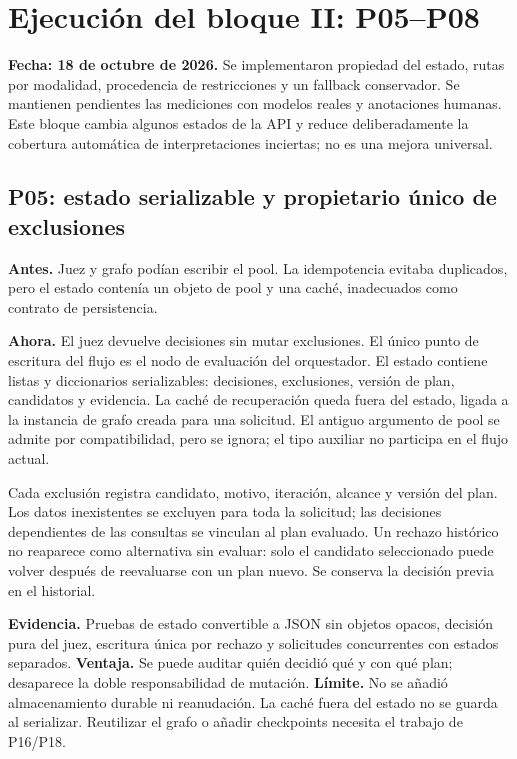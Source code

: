 \section{Ejecución del bloque II: P05--P08}
\label{sec:bloque2}
\textbf{Fecha: 18 de octubre de 2026.} Se implementaron propiedad del estado,
rutas por modalidad, procedencia de restricciones y un fallback conservador.
Se mantienen pendientes las mediciones con modelos reales y anotaciones humanas.
Este bloque cambia algunos estados de la API y reduce deliberadamente la
cobertura automática de interpretaciones inciertas; no es una mejora universal.

\subsection{P05: estado serializable y propietario único de exclusiones}
\textbf{Antes.} Juez y grafo podían escribir el pool. La idempotencia evitaba
duplicados, pero el estado contenía un objeto de pool y una caché, inadecuados
como contrato de persistencia.

\textbf{Ahora.} El juez devuelve decisiones sin mutar exclusiones. El único
punto de escritura del flujo es el nodo de evaluación del orquestador.
El estado contiene listas y diccionarios serializables: decisiones, exclusiones,
versión de plan, candidatos y evidencia. La caché de recuperación queda fuera
del estado, ligada a la instancia de grafo creada para una solicitud.
El antiguo argumento de pool se admite por compatibilidad, pero se ignora;
el tipo auxiliar no participa en el flujo actual.

Cada exclusión registra candidato, motivo, iteración, alcance y versión del
plan. Los datos inexistentes se excluyen para toda la solicitud; las decisiones
dependientes de las consultas se vinculan al plan evaluado. Un rechazo histórico
no reaparece como alternativa sin evaluar: solo el candidato seleccionado puede
volver después de reevaluarse con un plan nuevo. Se conserva la decisión previa
en el historial.

\textbf{Evidencia.} Pruebas de estado convertible a JSON sin objetos opacos,
decisión pura del juez, escritura única por rechazo y solicitudes concurrentes
con estados separados. \textbf{Ventaja.} Se puede auditar quién decidió qué y
con qué plan; desaparece la doble responsabilidad de mutación.
\textbf{Límite.} No se añadió almacenamiento durable ni reanudación. La caché
fuera del estado no se guarda al serializar. Reutilizar el grafo o añadir
checkpoints necesita el trabajo de P16/P18.

